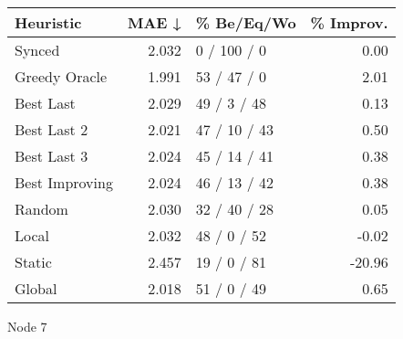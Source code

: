 \begin{tabular}{lrlr}
\toprule
\textbf{Heuristic} & \textbf{MAE ↓} & \textbf{\% Be/Eq/Wo} & \textbf{\% Improv.} \\
\midrule
            Synced &          2.032 &          0 / 100 / 0 &                0.00 \\
     Greedy Oracle &          1.991 &          53 / 47 / 0 &                2.01 \\
         Best Last &          2.029 &          49 / 3 / 48 &                0.13 \\
       Best Last 2 &          2.021 &         47 / 10 / 43 &                0.50 \\
       Best Last 3 &          2.024 &         45 / 14 / 41 &                0.38 \\
    Best Improving &          2.024 &         46 / 13 / 42 &                0.38 \\
            Random &          2.030 &         32 / 40 / 28 &                0.05 \\
             Local &          2.032 &          48 / 0 / 52 &               -0.02 \\
            Static &          2.457 &          19 / 0 / 81 &              -20.96 \\
            Global &          2.018 &          51 / 0 / 49 &                0.65 \\
\bottomrule
\end{tabular}
\caption{Node 7}
\label{tab:hr_non_lr01_le1_bs2_7}
